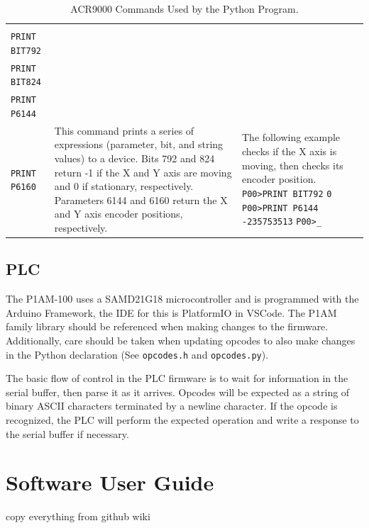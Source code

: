 \documentclass[titlepage]{article}
\begin{document}
\begin{table}
\begin{center}
\begin{tabularx}{\linewidth}{l|>{\raggedright\arraybackslash}X|>{\raggedright\arraybackslash}X}
      \makecell[lt]{
        \lstinline|PRINT| \\
        \lstinline|PRINT BIT792| \\
        \lstinline|PRINT BIT824| \\
        \lstinline|PRINT P6144| \\
        \lstinline|PRINT P6160|
      } &
      This command prints a series of expressions (parameter, bit, and string values) to a device. Bits 792 and 824 return -1 if the X and Y axis are moving and 0 if stationary, respectively. Parameters 6144 and 6160 return the X and Y axis encoder positions, respectively. &
      The following example checks if the X axis is moving, then checks its encoder position. \newline
      \lstinline|P00>PRINT BIT792| \newline
      \lstinline|0| \newline
      \lstinline|P00>PRINT P6144| \newline
      \lstinline|-235753513| \newline
      \lstinline|P00>_|
    \end{tabularx}
  \end{center}
  \caption{ACR9000 Commands Used by the Python Program.}\label{tab:acrcommands}
\end{table}

\subsection{PLC}\label{sec:commsplc}
The P1AM-100 uses a SAMD21G18 microcontroller and is programmed with the Arduino Framework, the IDE for this is PlatformIO in VSCode. The P1AM family library should be referenced when making changes to the firmware. Additionally, care should be taken when updating opcodes to also make changes in the Python declaration (See \verb|opcodes.h| and \verb|opcodes.py|).

The basic flow of control in the PLC firmware is to wait for information in the serial buffer, then parse it as it arrives. Opcodes will be expected as a string of binary ASCII characters terminated by a newline character. If the opcode is recognized, the PLC will perform the expected operation and write a response to the serial buffer if necessary.

\section{Software User Guide}
copy everything from github wiki
\end{document}
